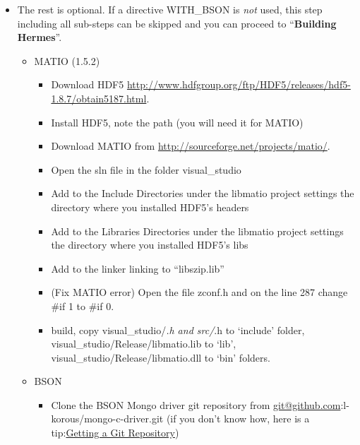 \documentclass[a4paper,0pt,english]{sphinxmanual}
\begin{document}
\begin{itemize}
\begin{itemize}
\end{itemize}

\item {} 
The rest is optional. If a directive WITH\_BSON is \emph{not} used, this step including all sub-steps can be skipped and you can proceed to ``\textbf{Building Hermes}''.
\begin{itemize}
\item {} 
MATIO (1.5.2)
\begin{itemize}
\item {} 
Download HDF5 \href{http://www.hdfgroup.org/ftp/HDF5/releases/hdf5-1.8.7/obtain5187.html}{http://www.hdfgroup.org/ftp/HDF5/releases/hdf5-1.8.7/obtain5187.html}.

\item {} 
Install HDF5, note the path (you will need it for MATIO)

\item {} 
Download MATIO from \href{http://sourceforge.net/projects/matio/}{http://sourceforge.net/projects/matio/}.

\item {} 
Open the sln file in the folder visual\_studio

\item {} 
Add to the Include Directories under the libmatio project settings the directory where you installed HDF5's headers

\item {} 
Add to the Libraries Directories under the libmatio project settings the directory where you installed HDF5's libs

\item {} 
Add to the linker linking to ``libszip.lib''

\item {} 
(Fix MATIO error) Open the file zconf.h and on the line 287 change \#if 1 to \#if 0.

\item {} 
build, copy visual\_studio/\emph{.h and src/}.h to `include' folder, visual\_studio/Release/libmatio.lib to `lib', visual\_studio/Release/libmatio.dll to `bin' folders.

\end{itemize}

\item {} 
BSON
\begin{itemize}
\item {} 
Clone the BSON Mongo driver git repository from \href{mailto:git@github.com}{git@github.com}:l-korous/mongo-c-driver.git (if you don't know how, here is a tip:\href{http://git-scm.com/book/en/Git-Basics-Getting-a-Git-Repository}{Getting a Git Repository})


\end{itemize}
\end{itemize}
\end{itemize}
\end{document}
